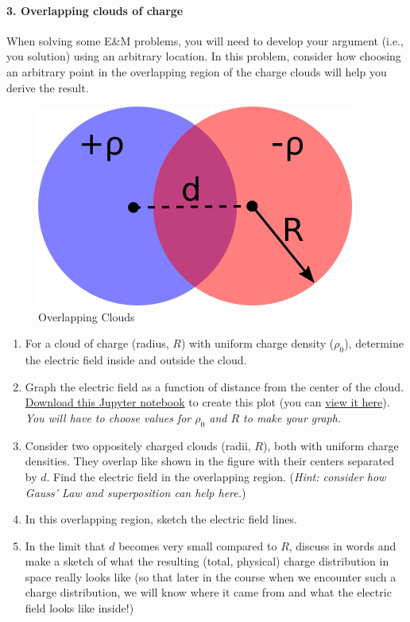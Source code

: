 \documentclass[11pt]{article}
\def\tightlist{}
\begin{document}
\paragraph{3. Overlapping clouds of
charge}\label{overlapping-clouds-of-charge}

When solving some E\&M problems, you will need to develop your argument
(i.e., you solution) using an arbitrary location. In this problem,
consider how choosing an arbitrary point in the overlapping region of
the charge clouds will help you derive the result.

\begin{figure}[htbp]
\centering
\includegraphics{./images/hw3/overlapping_clouds.png}
\caption{Overlapping Clouds}
\end{figure}

\begin{enumerate}
\def\labelenumi{\arabic{enumi}.}
\tightlist
\item
  For a cloud of charge (radius, \(R\)) with uniform charge density
  (\(\rho_0\)), determine the electric field inside and outside the
  cloud.
\item
  Graph the electric field as a function of distance from the center of
  the cloud. \href{../jupyter/HW3-LinePlotting.ipynb}{Download this
  Jupyter notebook} to create this plot (you can
  \href{https://github.com/dannycab/phy481msu/blob/gh-pages/jupyter/HW3-LinePlotting.ipynb}{view
  it here}). \emph{You will have to choose values for \(\rho_0\) and
  \(R\) to make your graph.}
\item
  Consider two oppositely charged clouds (radii, \(R\)), both with
  uniform charge densities. They overlap like shown in the figure with
  their centers separated by \(d\). Find the electric field in the
  overlapping region. (\emph{Hint: consider how Gauss' Law and
  superposition can help here.})
\item
  In this overlapping region, sketch the electric field lines.
\item
  In the limit that \(d\) becomes very small compared to \(R\), discuss
  in words and make a sketch of what the resulting (total, physical)
  charge distribution in space really looks like (so that later in the
  course when we encounter such a charge distribution, we will know
  where it came from and what the electric field looks like inside!)
\end{enumerate}
\end{document}
